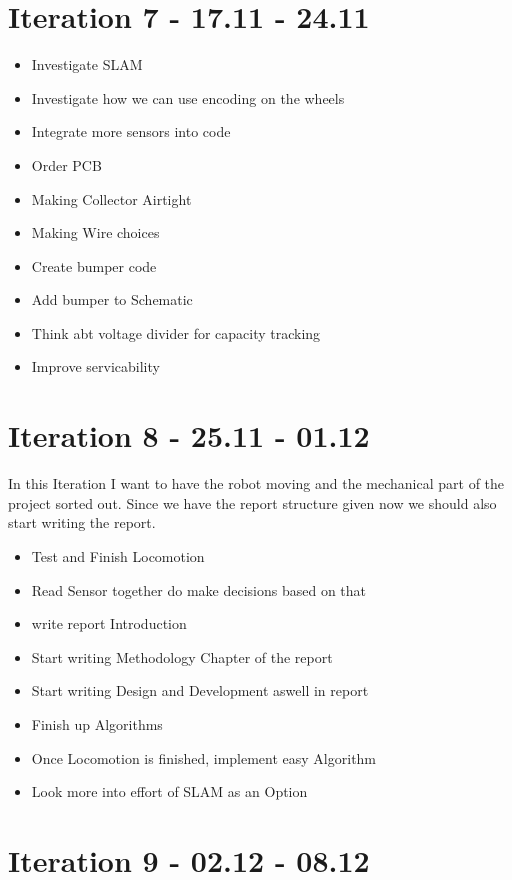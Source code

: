 \documentclass[a4paper, 12pt]{report}
\begin{document}
\section*{Iteration 7 - 17.11 - 24.11}

\begin{itemize}
    \item Investigate SLAM
    \item Investigate how we can use encoding on the wheels
    \item Integrate more sensors into code
    \item Order PCB
    \item Making Collector Airtight
    \item Making Wire choices
    \item Create bumper code
    \item Add bumper to Schematic
    \item Think abt voltage divider for capacity tracking
    \item Improve servicability
\end{itemize}

\section*{Iteration 8 - 25.11 - 01.12}

In this Iteration I want to have the robot moving and the mechanical
part of the project sorted out. Since we have the report structure given
now we should also start writing the report.

\begin{itemize}
    \item Test and Finish Locomotion
    \item Read Sensor together do make decisions based on that
    \item write report Introduction
    \item Start writing Methodology Chapter of the report
    \item Start writing Design and Development aswell in report
    \item Finish up Algorithms
    \item Once Locomotion is finished, implement easy Algorithm
    \item Look more into effort of SLAM as an Option
\end{itemize}

\section*{Iteration 9 - 02.12 - 08.12}
\end{document}
